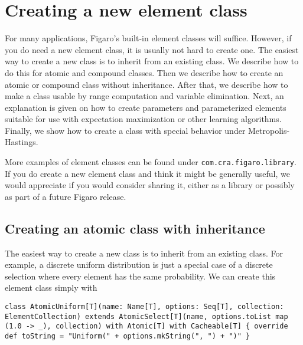 
\chapter{Creating a new element class} %

\label{Creating a new element class} %

For many applications, Figaro's built-in element classes will suffice. However, if you do need a new element class, it is usually not hard to create one. The easiest way to create a new class is to inherit from an existing class. We describe how to do this for atomic and compound classes. Then we describe how to create an atomic or compound class without inheritance. After that, we describe how to make a class usable by range computation and variable elimination. Next, an explanation is given on how to create parameters and parameterized elements suitable for use with expectation maximization or other learning algorithms. Finally, we show how to create a class with special behavior under Metropolis-Hastings.

More examples of element classes can be found under \texttt{com.cra.fig\-aro.library}. If you do create a new element class and think it might be generally useful, we would appreciate if you would consider sharing it, either as a library or possibly as part of a future Figaro release.

\section{Creating an atomic class with inheritance}

The easiest way to create a new class is to inherit from an existing class. For example, a discrete uniform distribution is just a special case of a discrete selection where every element has the same probability. We can create this element class simply with

\begin{flushleft}
\texttt{class AtomicUniform[T](name: Name[T], options: Seq[T], collection: \newline ElementCollection) extends
\newline \tab AtomicSelect[T](name, options.toList map (1.0 -> \_), collection)
\newline \tab with Atomic[T] with Cacheable[T] \{
\newline \tab override def toString = "Uniform(" + options.mkString(", ") + ")"
\}
}
\end{flushleft}

